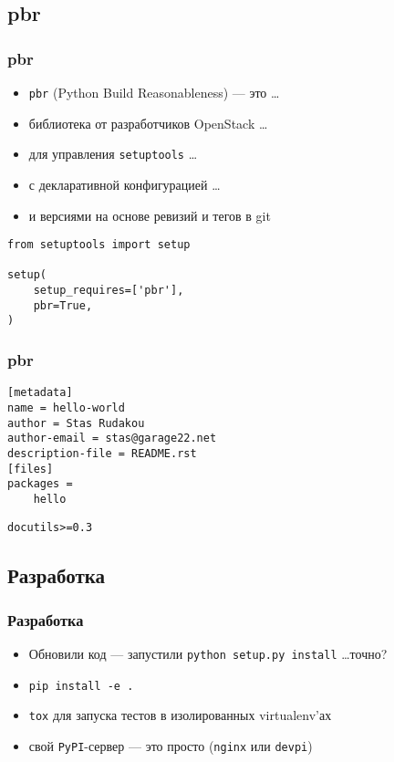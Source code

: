 \documentclass[10pt,pdf,utf8,russian,aspectratio=169,xcolor=dvipsnames,x11names,center]{beamer}
\begin{document}
\subsection{pbr}

\begin{frame}[fragile]
  \frametitle{pbr}

  \begin{itemize}
  \item {\tt pbr} (Python Build Reasonableness) --- это \ldots
  \item библиотека от разработчиков OpenStack \ldots
  \item для управления {\tt setuptools} \ldots\pause
  \item с декларативной конфигурацией \ldots
  \item и версиями на основе ревизий и тегов в git\pause
  \end{itemize}

  \pause

  \begin{lstlisting}
from setuptools import setup

setup(
    setup_requires=['pbr'],
    pbr=True,
)
  \end{lstlisting}

\end{frame}


\begin{frame}[fragile]
  \frametitle{pbr}

  \begin{lstlisting}[caption=setup.cfg]
[metadata]
name = hello-world
author = Stas Rudakou
author-email = stas@garage22.net
description-file = README.rst
[files]
packages =
    hello
  \end{lstlisting}

  \begin{lstlisting}[caption=requirements.txt]
docutils>=0.3
  \end{lstlisting}

\end{frame}

  
\subsection{Разработка}

\begin{frame}
  \frametitle{Разработка}

  \begin{itemize}
  \item Обновили код --- запустили {\tt python setup.py install} \ldots точно? \pause
  \item {\tt pip install -e .} \pause
  \item {\tt tox} для запуска тестов в изолированных virtualenv'ах \pause
  \item свой {\tt PyPI}-сервер --- это просто ({\tt nginx} или {\tt devpi})
  \end{itemize}
\end{frame}
\end{document}
